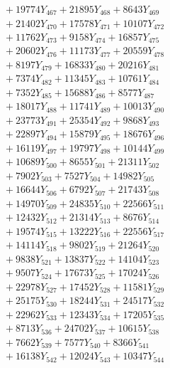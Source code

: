 \documentclass[a4paper,10pt]{article}
\begin{document}
{\begin{align}
&\;  + 19774 Y_{467} + 21895 Y_{468} + 8643 Y_{469} \\[0.3ex]
&\;  + 21402 Y_{470} + 17578 Y_{471} + 10107 Y_{472} \\[0.3ex]
&\;  + 11762 Y_{473} + 9158 Y_{474} + 16857 Y_{475} \\[0.3ex]
&\;  + 20602 Y_{476} + 11173 Y_{477} + 20559 Y_{478} \\[0.5ex]\allowbreak
&\;  + 8197 Y_{479} + 16833 Y_{480} + 20216 Y_{481} \\[0.3ex]
&\;  + 7374 Y_{482} + 11345 Y_{483} + 10761 Y_{484} \\[0.3ex]
&\;  + 7352 Y_{485} + 15688 Y_{486} + 8577 Y_{487} \\[0.3ex]
&\;  + 18017 Y_{488} + 11741 Y_{489} + 10013 Y_{490} \\[0.3ex]
&\;  + 23773 Y_{491} + 25354 Y_{492} + 9868 Y_{493} \\[0.3ex]
&\;  + 22897 Y_{494} + 15879 Y_{495} + 18676 Y_{496} \\[0.3ex]
&\;  + 16119 Y_{497} + 19797 Y_{498} + 10144 Y_{499} \\[0.3ex]
&\;  + 10689 Y_{500} + 8655 Y_{501} + 21311 Y_{502} \\[0.3ex]
&\;  + 7902 Y_{503} + 7527 Y_{504} + 14982 Y_{505} \\[0.3ex]
&\;  + 16644 Y_{506} + 6792 Y_{507} + 21743 Y_{508} \\[0.5ex]\allowbreak
&\;  + 14970 Y_{509} + 24835 Y_{510} + 22566 Y_{511} \\[0.3ex]
&\;  + 12432 Y_{512} + 21314 Y_{513} + 8676 Y_{514} \\[0.3ex]
&\;  + 19574 Y_{515} + 13222 Y_{516} + 22556 Y_{517} \\[0.3ex]
&\;  + 14114 Y_{518} + 9802 Y_{519} + 21264 Y_{520} \\[0.3ex]
&\;  + 9838 Y_{521} + 13837 Y_{522} + 14104 Y_{523} \\[0.3ex]
&\;  + 9507 Y_{524} + 17673 Y_{525} + 17024 Y_{526} \\[0.3ex]
&\;  + 22978 Y_{527} + 17452 Y_{528} + 11581 Y_{529} \\[0.3ex]
&\;  + 25175 Y_{530} + 18244 Y_{531} + 24517 Y_{532} \\[0.3ex]
&\;  + 22962 Y_{533} + 12343 Y_{534} + 17205 Y_{535} \\[0.3ex]
&\;  + 8713 Y_{536} + 24702 Y_{537} + 10615 Y_{538} \\[0.5ex]\allowbreak
&\;  + 7662 Y_{539} + 7577 Y_{540} + 8366 Y_{541} \\[0.3ex]
&\;  + 16138 Y_{542} + 12024 Y_{543} + 10347 Y_{544} \\[0.3ex]

\end{align}}
\end{document}
